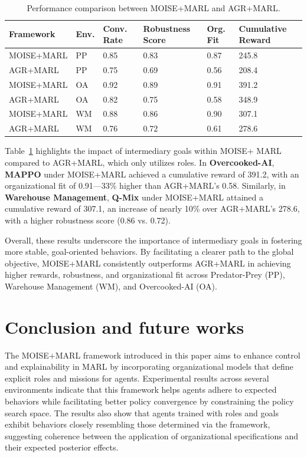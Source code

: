 \documentclass[conference]{IEEEtran}
\begin{document}
\begin{table}[h!]
    \centering
    \caption{Performance comparison between MOISE+MARL and AGR+MARL.}
    \label{tab:ablation_study}
    \small
    \renewcommand{\arraystretch}{1.1}
    \begin{tabular}{p{1.6cm}p{0.5cm}p{0.6cm}p{1.4cm}p{0.8cm}p{1.3cm}}
        \hline
        \textbf{Framework} & \textbf{Env.} & \textbf{Conv. Rate} & \textbf{Robustness Score} & \textbf{Org. Fit} & \textbf{Cumulative Reward} \\ \hline
        MOISE+MARL & PP & 0.85 & 0.83 & 0.87 & 245.8 \\
        AGR+MARL & PP & 0.75 & 0.69 & 0.56 & 208.4 \\
        MOISE+MARL & OA & 0.92 & 0.89 & 0.91 & 391.2 \\
        AGR+MARL & OA & 0.82 & 0.75 & 0.58 & 348.9 \\
        MOISE+MARL & WM & 0.88 & 0.86 & 0.90 & 307.1 \\
        AGR+MARL & WM & 0.76 & 0.72 & 0.61 & 278.6 \\ \hline
    \end{tabular}
\end{table}

\noindent Table~\ref{tab:ablation_study} highlights the impact of intermediary goals within MOISE+ MARL compared to AGR+MARL, which only utilizes roles. In \textbf{Overcooked-AI}, \textbf{MAPPO} under MOISE+MARL achieved a cumulative reward of 391.2, with an organizational fit of 0.91—33\% higher than AGR+MARL's 0.58. Similarly, in \textbf{Warehouse Management}, \textbf{Q-Mix} under MOISE+MARL attained a cumulative reward of 307.1, an increase of nearly 10\% over AGR+MARL's 278.6, with a higher robustness score (0.86 vs. 0.72).

Overall, these results underscore the importance of intermediary goals in fostering more stable, goal-oriented behaviors. By facilitating a clearer path to the global objective, MOISE+MARL consistently outperforms AGR+MARL in achieving higher rewards, robustness, and organizational fit across Predator-Prey (PP), Warehouse Management (WM), and Overcooked-AI (OA).


\section{Conclusion and future works}
\label{sec:discussion_conclusion_future_work}

The MOISE+MARL framework introduced in this paper aims to enhance control and explainability in MARL by incorporating organizational models that define explicit roles and missions for agents. Experimental results across several environments indicate that this framework helps agents adhere to expected behaviors while facilitating better policy convergence by constraining the policy search space. The results also show that agents trained with roles and goals exhibit behaviors closely resembling those determined via the framework, suggesting coherence between the application of organizational specifications and their expected posterior effects.
\end{document}
